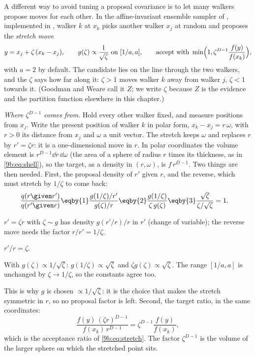 A different way to avoid tuning a proposal covariance is to let many walkers propose moves for
each other. In the affine-invariant ensemble sampler of \textcite{GoodmanWeare2010}, implemented
in  \parencite{ForemanMackey2013}, walker $k$ at $x_k$ picks another walker $x_j$ at
random and proposes the \emph{stretch move}
\begin{equation}
  y=x_j+\zeta\,(x_k-x_j),\qquad g(\zeta)\propto\frac{1}{\sqrt\zeta}\ \text{on }[1/a,a],
  \qquad \text{accept with }\min\Bigl(1,\zeta^{D-1}\frac{f(y)}{f(x_k)}\Bigr),
  \label{9b:eq:stretch}
\end{equation}
with $a=2$ by default. The candidate lies on the line through the two walkers, and the
 $\zeta$ says how far along it: $\zeta>1$ moves walker $k$ away from walker
$j$, $\zeta<1$ towards it. (Goodman and Weare call it $Z$; we write $\zeta$ because $Z$ is the
evidence and the partition function elsewhere in this chapter.)

\emph{Where $\zeta^{D-1}$ comes from.} Hold every other walker fixed, and measure positions from
$x_j$. Write the present position of walker $k$ in polar form, $x_k-x_j=r\,\omega$, with $r>0$ its
distance from $x_j$ and $\omega$ a unit vector. The stretch keeps $\omega$ and replaces $r$ by
$r'=\zeta r$: it is a one-dimensional move in $r$. In polar coordinates the volume element is
$r^{D-1}\dd r\,\dd\omega$ (the area of a sphere of radius $r$ times its thickness, as in
\eqref{9b:eq:shell}), so the target, as a density in $(r,\omega)$, is $f\,r^{D-1}$. Two things are
then needed. First, the proposal density of $r'$ given $r$, and the reverse, which must stretch by
$1/\zeta$ to come back:
\begin{align*}
  \frac{q(r\given r')}{q(r'\given r)}
  &\eqby{1}\frac{g(1/\zeta)/r'}{g(\zeta)/r}
   \eqby{2}\frac{g(1/\zeta)}{\zeta\,g(\zeta)}
   \eqby{3}\frac{\sqrt\zeta}{\zeta/\sqrt\zeta}=1 .
\end{align*}
\begin{explain}
  \item $r'=\zeta r$ with $\zeta\sim g$ has density $g(r'/r)/r$ in $r'$ (change of variable);
        the reverse move needs the factor $r/r'=1/\zeta$.
  \item $r'/r=\zeta$.
  \item With $g(\zeta)\propto1/\sqrt\zeta$: $g(1/\zeta)\propto\sqrt\zeta$ and
        $\zeta g(\zeta)\propto\sqrt\zeta$. The range $[1/a,a]$ is unchanged by $\zeta\to1/\zeta$,
        so the constants agree too.
\end{explain}
This is why $g$ is chosen $\propto1/\sqrt\zeta$: it is the choice that makes the stretch
symmetric in $r$, so no proposal factor is left. Second, the target ratio, in the same
coordinates:
\begin{equation*}
  \frac{f(y)\,(\zeta r)^{D-1}}{f(x_k)\,r^{D-1}}=\zeta^{D-1}\frac{f(y)}{f(x_k)} ,
\end{equation*}
which is the acceptance ratio of \eqref{9b:eq:stretch}. The factor $\zeta^{D-1}$ is the volume of
the larger sphere on which the stretched point sits.

